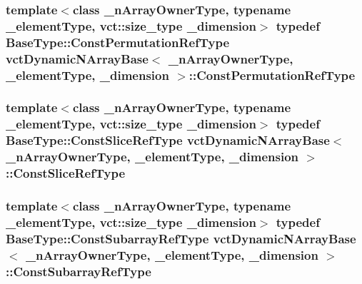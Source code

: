 \hypertarget{classvct_dynamic_n_array_base_a8e5f4edd6bbaaa0650c24f464a5c13b6}{
\subsubsection[{Const\-Permutation\-Ref\-Type}]{\setlength{\rightskip}{0pt plus 5cm}template$<$class \-\_\-n\-Array\-Owner\-Type, typename \-\_\-element\-Type, vct\-::size\-\_\-type \-\_\-dimension$>$ typedef {\bf Base\-Type\-::\-Const\-Permutation\-Ref\-Type} {\bf vct\-Dynamic\-N\-Array\-Base}$<$ \-\_\-n\-Array\-Owner\-Type, \-\_\-element\-Type, \-\_\-dimension $>$\-::{\bf Const\-Permutation\-Ref\-Type}}}\label{classvct_dynamic_n_array_base_a8e5f4edd6bbaaa0650c24f464a5c13b6}
\hypertarget{classvct_dynamic_n_array_base_ac83089be31d75a0a4c8ef603506f820f}{
\subsubsection[{Const\-Slice\-Ref\-Type}]{\setlength{\rightskip}{0pt plus 5cm}template$<$class \-\_\-n\-Array\-Owner\-Type, typename \-\_\-element\-Type, vct\-::size\-\_\-type \-\_\-dimension$>$ typedef {\bf Base\-Type\-::\-Const\-Slice\-Ref\-Type} {\bf vct\-Dynamic\-N\-Array\-Base}$<$ \-\_\-n\-Array\-Owner\-Type, \-\_\-element\-Type, \-\_\-dimension $>$\-::{\bf Const\-Slice\-Ref\-Type}}}\label{classvct_dynamic_n_array_base_ac83089be31d75a0a4c8ef603506f820f}
\hypertarget{classvct_dynamic_n_array_base_a022316a8c3f976026301c5da668d1fb4}{
\subsubsection[{Const\-Subarray\-Ref\-Type}]{\setlength{\rightskip}{0pt plus 5cm}template$<$class \-\_\-n\-Array\-Owner\-Type, typename \-\_\-element\-Type, vct\-::size\-\_\-type \-\_\-dimension$>$ typedef {\bf Base\-Type\-::\-Const\-Subarray\-Ref\-Type} {\bf vct\-Dynamic\-N\-Array\-Base}$<$ \-\_\-n\-Array\-Owner\-Type, \-\_\-element\-Type, \-\_\-dimension $>$\-::{\bf Const\-Subarray\-Ref\-Type}}}\label{classvct_dynamic_n_array_base_a022316a8c3f976026301c5da668d1fb4}
